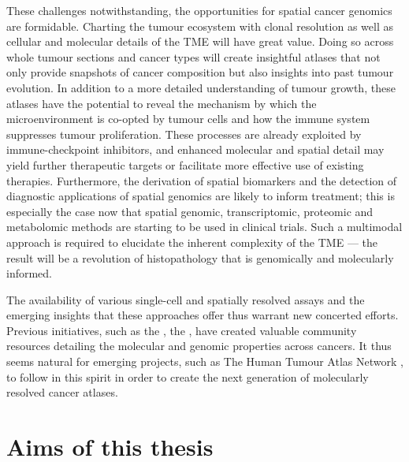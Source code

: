 These challenges notwithstanding, the opportunities for spatial cancer genomics are formidable. Charting the tumour ecosystem with clonal resolution as well as cellular and molecular details of the \ac{TME} will have great value. Doing so across whole tumour sections and cancer types will create insightful atlases that not only provide snapshots of cancer composition but also insights into past tumour evolution. In addition to a more detailed understanding of tumour growth, these atlases have the potential to reveal the mechanism by which the microenvironment is co-opted by tumour cells and how the immune system suppresses tumour proliferation. These processes are already exploited by immune-checkpoint inhibitors, and enhanced molecular and spatial detail may yield further therapeutic targets or facilitate more effective use of existing therapies. Furthermore, the derivation of spatial biomarkers and the detection of diagnostic applications of spatial genomics are likely to inform treatment; this is especially the case now that spatial genomic, transcriptomic, proteomic and metabolomic methods are starting to be used in clinical trials. Such a multimodal approach is required to elucidate the inherent complexity of the \ac{TME} — the result will be a revolution of histopathology that is genomically and molecularly informed.

The availability of various single-cell and spatially resolved assays and the emerging insights that these approaches offer thus warrant new concerted efforts. Previous initiatives, such as the \textcite{Cancer_Genome_Atlas_Research_Network2013-ox}, the \textcite{International_Cancer_Genome_Consortium2010-ww, ICGCTCGA_Pan-Cancer_Analysis_of_Whole_Genomes_Consortium2020-vu}, have created valuable community resources detailing the molecular and genomic properties across cancers. It thus seems natural for emerging projects, such as The Human Tumour Atlas Network \parencite{Rozenblatt-Rosen2020-bl}, to follow in this spirit in order to create the next generation of molecularly resolved cancer atlases.

\section{Aims of this thesis}
\label{sec:aims-of-the-thesis}

